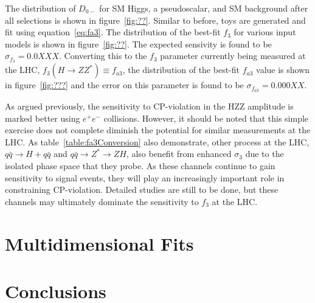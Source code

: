 The distribution of $D_{0-}$ for SM Higgs, a pseudoscalar,
and SM background after all selections is shown in 
figure~\ref{fig:??}.  Similar to before, toys are generated
and fit using equation~\ref{eq:fa3}.  The distribution of
the best-fit $f_3$ for various input models is shown in 
figure~\ref{fig:??}.  The expected sensivity is found to be 
$\sigma_{f_3}=0.0XXX$.  Converting this to the $f_3$ parameter
currently being measured at the LHC, $f_3(H\to ZZ^*)\equiv f_{a3}$, 
the distribution of the best-fit $f_{a3}$ value is shown in 
figure~\ref{fig:???} and the error on this parameter is found
to be $\sigma_{f_{a3}}=0.000XX$.

As argued previously, the sensitivity to CP-violation in the 
HZZ amplitude is marked better using $e^+e^-$ collisions.  
However, it should be noted that this simple exercise does not
complete diminish the potential for similar measurements at 
the LHC.  As table~\ref{table:fa3Conversion} also demonstrate,
other process at the LHC, $q\bar{q}\to H + q\bar{q}$ and
$q\bar{q}\to Z^* \to ZH$, also benefit from enhanced $\sigma_3$
due to the isolated phase space that they probe.  As these channels 
continue to gain sensitivity to signal events, they will play an
increasingly important role in constraining CP-violation.
Detailed studies are still to be done, but these channels may
ultimately dominate the sensitivity to $f_3$ at the LHC.  

\section{Multidimensional Fits}



\section{Conclusions}



